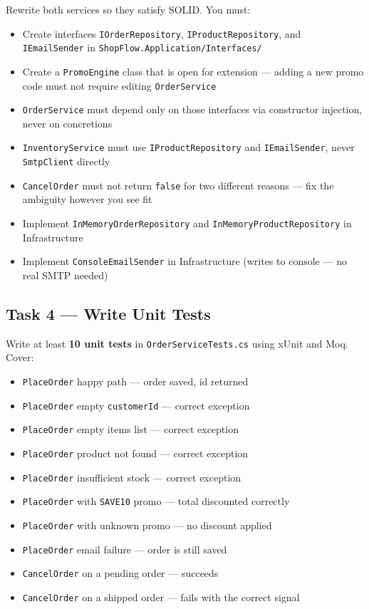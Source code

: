 \documentclass[11pt,a4paper]{article}
\begin{document}
Rewrite both services so they satisfy SOLID. You must:

\begin{itemize}[leftmargin=1.5em,itemsep=3pt]
  \item Create interfaces \texttt{IOrderRepository}, \texttt{IProductRepository},
        and \texttt{IEmailSender} in \texttt{ShopFlow.Application/Interfaces/}
  \item Create a \texttt{PromoEngine} class that is open for extension ---
        adding a new promo code must not require editing \texttt{OrderService}
  \item \texttt{OrderService} must depend only on those interfaces via
        constructor injection, never on concretions
  \item \texttt{InventoryService} must use \texttt{IProductRepository}
        and \texttt{IEmailSender}, never \texttt{SmtpClient} directly
  \item \texttt{CancelOrder} must not return \texttt{false} for two different
        reasons --- fix the ambiguity however you see fit
  \item Implement \texttt{InMemoryOrderRepository} and
        \texttt{InMemoryProductRepository} in Infrastructure
  \item Implement \texttt{ConsoleEmailSender} in Infrastructure
        (writes to console --- no real SMTP needed)
\end{itemize}

\subsection{Task 4 --- Write Unit Tests}

Write at least \textbf{10 unit tests} in \texttt{OrderServiceTests.cs}
using xUnit and Moq. Cover:

\begin{itemize}[leftmargin=1.5em,itemsep=3pt]
  \item \texttt{PlaceOrder} happy path --- order saved, id returned
  \item \texttt{PlaceOrder} empty \texttt{customerId} --- correct exception
  \item \texttt{PlaceOrder} empty items list --- correct exception
  \item \texttt{PlaceOrder} product not found --- correct exception
  \item \texttt{PlaceOrder} insufficient stock --- correct exception
  \item \texttt{PlaceOrder} with \texttt{SAVE10} promo --- total discounted correctly
  \item \texttt{PlaceOrder} with unknown promo --- no discount applied
  \item \texttt{PlaceOrder} email failure --- order is still saved
  \item \texttt{CancelOrder} on a pending order --- succeeds
  \item \texttt{CancelOrder} on a shipped order --- fails with the correct signal
\end{itemize}
\end{document}
